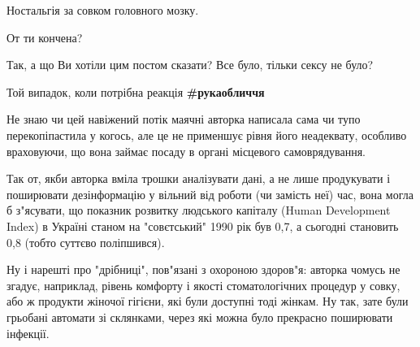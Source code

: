 \begin{itemize}
Ностальгія за совком головного мозку.

От ти кончена?

Так, а що Ви хотіли цим постом сказати? Все було, тільки сексу не було?

Той випадок, коли потрібна реакція \textbf{\#рукаобличчя}


Не знаю чи цей навіжений потік маячні авторка написала сама чи тупо
перекопіпастила у когось, але це не применшує рівня його неадеквату, особливо
враховуючи, що вона займає посаду в органі місцевого самоврядування.

Так от, якби авторка вміла трошки аналізувати дані, а не лише продукувати і
поширювати дезінформацію у вільний від роботи (чи замість неї) час, вона могла
б з"ясувати, що показник розвитку людського капіталу (Human Development Index)
в Україні станом на "совєтський" 1990 рік був 0,7, а сьогодні становить 0,8
(тобто суттєво поліпшився).

Ну і нарешті про "дрібниці", пов"язані з охороною здоров"я: авторка чомусь не
згадує, наприклад, рівень комфорту і якості стоматологічних процедур у совку,
або ж продукти жіночої гігієни, які були доступні тоді жінкам. Ну так, зате
були грьобані автомати зі склянками, через які можна було прекрасно поширювати
інфекції.



\end{itemize}
